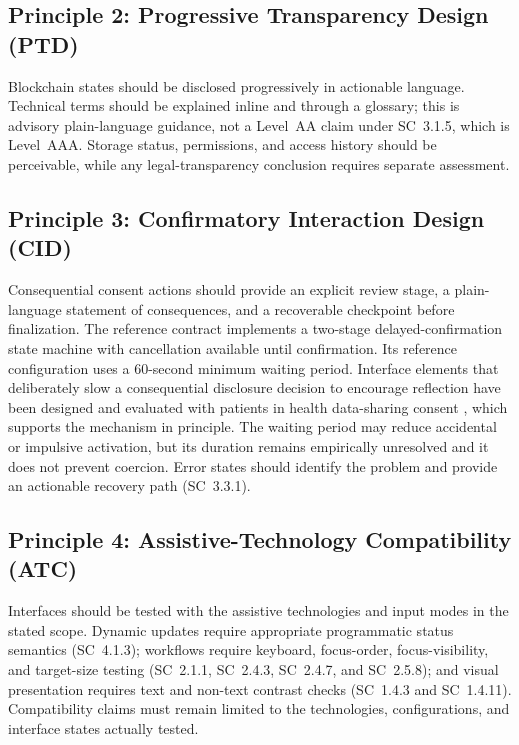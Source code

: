 \documentclass[journal]{IEEEtran}
\begin{document}
\subsection{Principle 2: Progressive Transparency Design (PTD)}

Blockchain states should be disclosed progressively in actionable language. Technical terms should be explained inline and through a glossary; this is advisory plain-language guidance, not a Level~AA claim under SC~3.1.5, which is Level~AAA. Storage status, permissions, and access history should be perceivable, while any legal-transparency conclusion requires separate assessment.

\subsection{Principle 3: Confirmatory Interaction Design (CID)}

Consequential consent actions should provide an explicit review stage, a plain-language statement of consequences, and a recoverable checkpoint before finalization. The reference contract implements a two-stage delayed-confirmation state machine with cancellation available until confirmation. Its reference configuration uses a 60-second minimum waiting period. Interface elements that deliberately slow a consequential disclosure decision to encourage reflection have been designed and evaluated with patients in health data-sharing consent \cite{leimstadtner2024value}, which supports the mechanism in principle. The waiting period may reduce accidental or impulsive activation, but its duration remains empirically unresolved and it does not prevent coercion. Error states should identify the problem and provide an actionable recovery path (SC~3.3.1).

\subsection{Principle 4: Assistive-Technology Compatibility (ATC)}

Interfaces should be tested with the assistive technologies and input modes in the stated scope. Dynamic updates require appropriate programmatic status semantics (SC~4.1.3); workflows require keyboard, focus-order, focus-visibility, and target-size testing (SC~2.1.1, SC~2.4.3, SC~2.4.7, and SC~2.5.8); and visual presentation requires text and non-text contrast checks (SC~1.4.3 and SC~1.4.11). Compatibility claims must remain limited to the technologies, configurations, and interface states actually tested.
\end{document}
